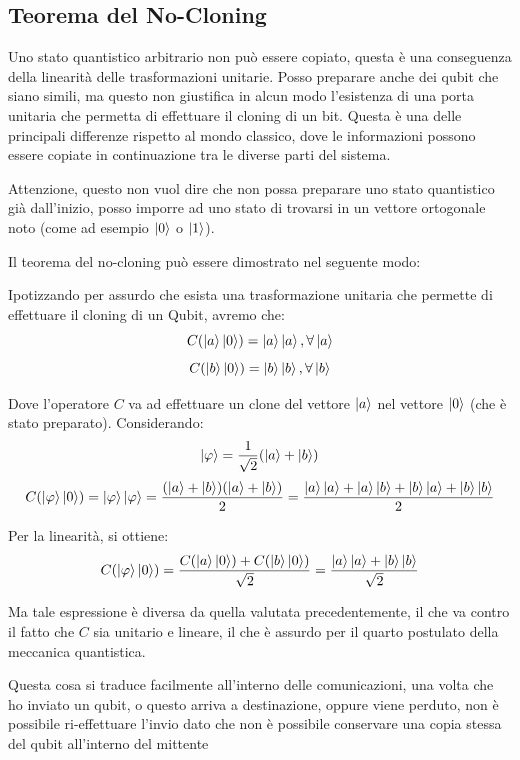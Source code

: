 \subsection{Teorema del No-Cloning}
Uno stato quantistico arbitrario non può essere copiato, questa è una conseguenza della linearità delle trasformazioni unitarie. Posso preparare anche dei qubit che siano simili, ma questo non giustifica in alcun modo l'esistenza di una porta unitaria che permetta di effettuare il cloning di un bit. Questa è una delle principali differenze rispetto al mondo classico, dove le informazioni possono essere copiate in continuazione tra le diverse parti del sistema. 

Attenzione, questo non vuol dire che non possa preparare uno stato quantistico già dall'inizio, posso imporre ad uno stato di trovarsi in un vettore ortogonale noto (come ad esempio \(\ket{0}\) o \(\ket{1}\)). 

Il teorema del no-cloning può essere dimostrato nel seguente modo:

Ipotizzando per assurdo che esista una trasformazione unitaria che permette di effettuare il cloning di un Qubit, avremo che:
\[
C(\ket{a} \ket{0}) = \ket{a} \ket{a}, \forall \ket{a}
\]
\[
C(\ket{b} \ket{0}) = \ket{b} \ket{b}, \forall \ket{b}
\]

Dove l'operatore \(C\) va ad effettuare un clone del vettore \(\ket{a}\) nel vettore \(\ket{0}\) (che è stato preparato). Considerando:
\[
\ket{\varphi} = \frac{1}{\sqrt{2}}(\ket{a} + \ket{b})
\]
\[
C(\ket{\varphi} \ket{0}) = \ket{\varphi} \ket{\varphi} = \frac{(\ket{a}+\ket{b})(\ket{a}+\ket{b})}{2} = \frac{\ket{a}\ket{a}+ \ket{a}\ket{b}+\ket{b}\ket{a}+\ket{b}\ket{b}}{2}
\]

Per la linearità, si ottiene:
\[
C(\ket{\varphi} \ket{0}) = \frac{C(\ket{a} \ket{0})+C(\ket{b}\ket{0})}{\sqrt{2}} = \frac{\ket{a}\ket{a} + \ket{b}\ket{b}}{\sqrt{2}}
\]

Ma tale espressione è diversa da quella valutata precedentemente, il che va contro il fatto che \(C\) sia unitario e lineare, il che è assurdo per il quarto postulato della meccanica quantistica.

Questa cosa si traduce facilmente all'interno delle comunicazioni, una volta che ho inviato un qubit, o questo arriva a destinazione, oppure viene perduto, non è possibile ri-effettuare l'invio dato che non è possibile conservare una copia stessa del qubit all'interno del mittente


